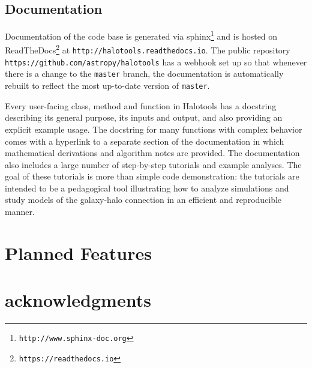 \documentclass[usenatbib,usegraphicx,letterpaper]{mn2e}
\begin{document}
\subsection{Documentation}
\label{subsection:documentation}

Documentation of the code base is generated via sphinx\footnote{\tt http://www.sphinx-doc.org} and is hosted on ReadTheDocs\footnote{\tt https://readthedocs.io} at {\tt http://halotools.readthedocs.io}. The public repository {\tt https://github.com/astropy/halotools} has a webhook set up so that whenever there is a change to the {\tt master} branch, the documentation is automatically rebuilt to reflect the most up-to-date version of {\tt master}. 

Every user-facing class, method and function in Halotools has a docstring describing its general purpose, its inputs and output, and also providing an explicit example usage. The docstring for many functions with complex behavior comes with a hyperlink to a separate section of the documentation in which mathematical derivations and algorithm notes are provided. The documentation also includes a large number of step-by-step tutorials and example analyses. The goal of these tutorials is more than simple code demonstration: the tutorials are intended to be a pedagogical tool illustrating how to analyze simulations and study models of the galaxy-halo connection in an efficient and reproducible manner. 


\section{Planned Features}
\label{section:planned_features}


\section{acknowledgments}












\end{document}
